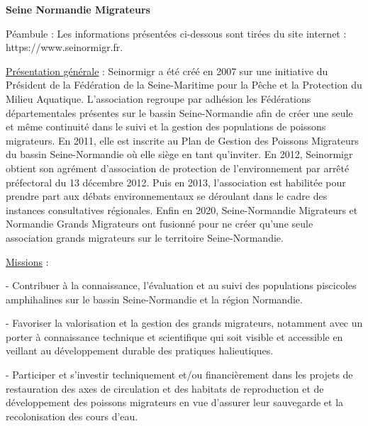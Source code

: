 \documentclass[11pt,titlepage,twoside]{article}\usepackage[]{graphicx}\usepackage[table]{xcolor}
\begin{document}
\listoffigures

\listoftables

\hypersetup{pageanchor=false}

\clearpage

 \setcounter{page}{1} 

\clearpage

\begin{center}
\textbf{Seine Normandie Migrateurs}
\end{center}


Péambule : Les informations présentées ci-dessous sont tirées du site internet : https://www.seinormigr.fr.

\vspace{0.5cm}
\underline{Présentation générale} : Seinormigr a été créé en 2007 sur une initiative du Président de la Fédération de la Seine-Maritime pour la Pêche et la Protection du Milieu Aquatique. 
L’association regroupe par adhésion les Fédérations départementales présentes sur le bassin Seine-Normandie afin de créer une seule et même continuité dans le suivi et la gestion des populations de poissons migrateurs. 
En 2011, elle est inscrite au Plan de Gestion des Poissons Migrateurs du bassin Seine-Normandie où elle siège en tant qu’inviter. 
En 2012, Seinormigr obtient son agrément d’association de protection de l’environnement par arrêté préfectoral du 13 décembre 2012. 
Puis en 2013, l'association est habilitée pour prendre part aux débats environnementaux se déroulant dans le cadre des instances consultatives régionales. 
Enfin en 2020, Seine-Normandie Migrateurs et Normandie Grands Migrateurs ont fusionné pour ne créer qu'une seule association grands migrateurs sur le territoire Seine-Normandie.
\vspace{0.5cm}

\underline{Missions} :

-	Contribuer à la connaissance, l’évaluation et au suivi des populations piscicoles amphihalines sur le bassin Seine-Normandie et la région Normandie.

-	Favoriser la valorisation et la gestion des grands migrateurs, notamment avec un porter à connaissance technique et scientifique qui soit visible et accessible en veillant au développement durable des pratiques halieutiques.

-	Participer et s’investir techniquement et/ou financièrement dans les projets de restauration des axes de circulation et des habitats de reproduction et de développement des poissons migrateurs en vue d’assurer leur sauvegarde et la recolonisation des cours d’eau.
\end{document}
